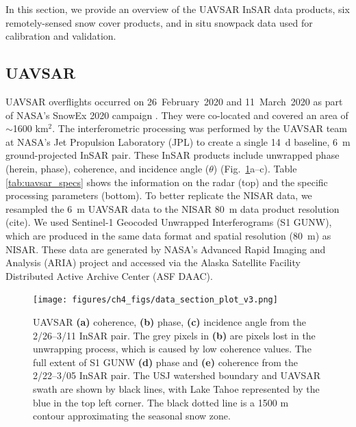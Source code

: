 In this section, we provide an overview of the UAVSAR InSAR data products, six remotely-sensed snow cover products, and in situ snowpack data used for calibration and validation.

\hypertarget{ch4-methods-1}{\subsection{UAVSAR}\label{ch4-methods-1}}

UAVSAR overflights occurred on 26~February~2020 and 11~March~2020 as part of NASA's SnowEx 2020 campaign \citep{marshallNASASnowEx20202019}. They were co-located and covered an area of $\sim$1600 km$^{2}$. The interferometric processing was performed by the UAVSAR team at NASA's Jet Propulsion Laboratory (JPL) to create a single 14~d baseline, 6~m ground-projected InSAR pair. These InSAR products include unwrapped phase (herein, phase), coherence, and incidence angle ($\theta$) (Fig.~\ref{fig:uavsar_cor_inc_phase_plot}a--c). Table \ref{tab:uavsar_specs} shows the information on the radar (top) and the specific processing parameters (bottom). To better replicate the NISAR data, we resampled the 6~m UAVSAR data to the NISAR 80~m data product resolution (cite). We used Sentinel-1 Geocoded Unwrapped Interferograms (S1 GUNW), which are produced in the same data format and spatial resolution (80~m) as NISAR. These data are generated by NASA's Advanced Rapid Imaging and Analysis (ARIA) \citep{bekaertDevelopmentDisseminationStandardized2019,buzzangaSustainedMonitoringSubsidence2020} project and accessed via the Alaska Satellite Facility Distributed Active Archive Center (ASF DAAC).

\begin{figure}[ht]
\texttt{[image: figures/ch4\_figs/data\_section\_plot\_v3.png]}
\centering
\caption{UAVSAR \textbf{(a)} coherence, \textbf{(b)} phase, \textbf{(c)} incidence angle from the 2/26--3/11 InSAR pair. The grey pixels in \textbf{(b)} are pixels lost in the unwrapping process, which is caused by low coherence values. The full extent of S1 GUNW \textbf{(d)} phase and \textbf{(e)} coherence from the 2/22--3/05 InSAR pair. The USJ watershed boundary and UAVSAR swath are shown by black lines, with Lake Tahoe represented by the blue in the top left corner. The black dotted line is a 1500 m contour approximating the seasonal snow zone.}
\label{fig:uavsar_cor_inc_phase_plot}
\end{figure}
\clearpage

